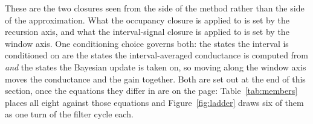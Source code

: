 
These are the two closures seen from the side of the method rather than the side of the
approximation. What the occupancy closure is applied to is set by the recursion axis, and
what the interval-signal closure is applied to is set by the window axis. One conditioning
choice governs both: the states the interval is conditioned on are the states the
interval-averaged conductance is computed from \emph{and} the states the Bayesian update is
taken on, so moving along the window axis moves the conductance and the gain together. Both
are set out at the end of this section, once the equations they differ in are on the page:
Table~\ref{tab:members} places all eight against those equations and
Figure~\ref{fig:ladder} draws six of them as one turn of the filter cycle each.

